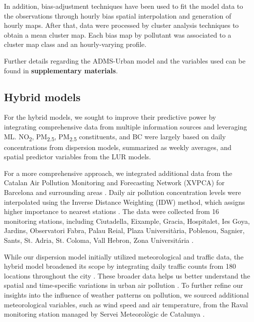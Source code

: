 \documentclass{article}
\begin{document}
In addition, bias-adjustment techniques have been used to fit the model data to the observations through hourly bias spatial interpolation and generation of hourly maps. After that, data were processed  by cluster analysis techniques to obtain a mean cluster map. Each bias map by pollutant was associated to a cluster map class and an hourly-varying profile. 

Further details regarding the ADMS-Urban model and the variables used can be found in \textbf{supplementary materials}.

\subsection{Hybrid models}

For the hybrid models, we sought to improve their predictive power by integrating comprehensive data from multiple information sources and leveraging ML. NO\textsubscript{2}, PM\textsubscript{2.5}, PM\textsubscript{2.5} constituents, and BC were largely based on daily concentrations from dispersion models, summarized as weekly averages, and spatial predictor variables from the LUR models. 

For a more comprehensive approach, we integrated additional data from the Catalan Air Pollution Monitoring and Forecasting Network (XVPCA) for Barcelona and surrounding areas \cite{xarxa2012}. Daily air pollution concentration levels were interpolated using the Inverse Distance Weighting (IDW) method, which assigns higher importance to nearest stations \cite{hoek2017methods}. The data were collected from 16 monitoring stations, including Ciutadella, Eixample, Gracia, Hospitalet, Ies Goya, Jardins, Observatori Fabra, Palau Reial, Plaza Universitària, Poblenou, Sagnier, Sants, St. Adria, St. Coloma, Vall Hebron, Zona Universitária \cite{xarxa2012}.

While our dispersion model initially utilized meteorological and traffic data, the hybrid model broadened its scope by integrating daily traffic counts from 180 locations throughout the city \cite{trafficbcn}. These broader data helps us better understand the spatial and time-specific variations in urban air pollution \cite{pinto2020}. To further refine our insights into the influence of weather patterns on pollution, we sourced additional meteorological variables, such as wind speed and air temperature, from the Raval monitoring station managed by Servei Meteorològic de Catalunya \cite{xema2013}.
\end{document}
